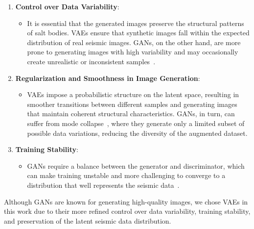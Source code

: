 \documentclass{ieeeaccess}
\begin{document}
\begin{enumerate}
    \item \textbf{Control over Data Variability}:
    \begin{itemize}
        \item It is essential that the generated images preserve the structural patterns of salt bodies. VAEs ensure that synthetic images fall within the expected distribution of real seismic images. GANs, on the other hand, are more prone to generating images with high variability and may occasionally create unrealistic or inconsistent samples~\cite{Zhou2018}.
    \end{itemize}
    \item \textbf{Regularization and Smoothness in Image Generation}:
    \begin{itemize}
        \item VAEs impose a probabilistic structure on the latent space, resulting in smoother transitions between different samples and generating images that maintain coherent structural characteristics. GANs, in turn, can suffer from mode collapse~\cite{Zhou2018}, where they generate only a limited subset of possible data variations, reducing the diversity of the augmented dataset.
    \end{itemize}
    \item \textbf{Training Stability}:
    \begin{itemize}
        \item GANs require a balance between the generator and discriminator, which can make training unstable and more challenging to converge to a distribution that well represents the seismic data~\cite{Zhou2018}.
    \end{itemize}
\end{enumerate}

Although GANs are known for generating high-quality images, we chose VAEs in this work due to their more refined control over data variability, training stability, and preservation of the latent seismic data distribution.
\end{document}
